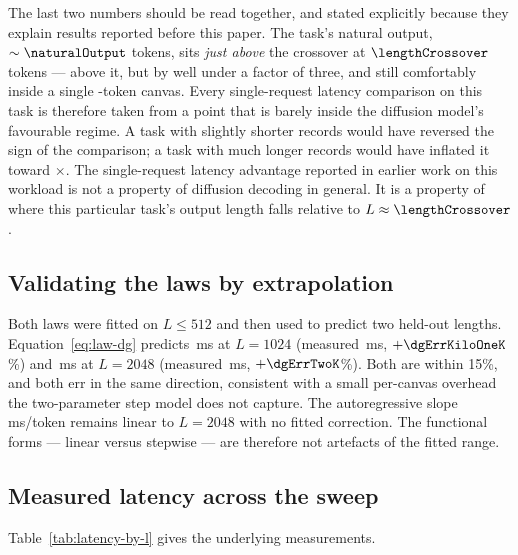 \noindent
The last two numbers should be read together, and stated explicitly because they
explain results reported before this paper. The task's natural output,
$\sim\naturalOutput$ tokens, sits \emph{just above} the crossover at
$\lengthCrossover$ tokens --- above it, but by well under a factor of three, and
still comfortably inside a single \dgCanvas{}-token canvas. Every single-request
latency comparison on this task is therefore taken from a point that is barely
inside the diffusion model's favourable regime. A task with slightly shorter
records would have reversed the sign of the comparison; a task with much longer
records would have inflated it toward \asymptoticRatio$\times$. The
single-request latency advantage reported in earlier work on this workload is
not a property of diffusion decoding in general. It is a property of where this
particular task's output length falls relative to
$L \approx \lengthCrossover$.

\subsection{Validating the laws by extrapolation}
\label{sec:cost-laws:validation}

Both laws were fitted on $L \le 512$ and then used to predict two held-out
lengths. Equation~\eqref{eq:law-dg} predicts \dgPredKiloOneK{}\,ms at $L=1024$
(measured \dgMeasKiloOneK{}\,ms, $+\dgErrKiloOneK$\%) and \dgPredTwoK{}\,ms at
$L=2048$ (measured \dgMeasTwoK{}\,ms, $+\dgErrTwoK$\%). Both are within 15\%,
and both err in the same direction, consistent with a small per-canvas overhead
the two-parameter step model does not capture. The autoregressive slope
\arSlope{}\,ms/token remains linear to $L=2048$ with no fitted correction. The
functional forms --- linear versus stepwise --- are therefore not artefacts of
the fitted range.

\subsection{Measured latency across the sweep}
\label{sec:cost-laws:table}

Table~\ref{tab:latency-by-l} gives the underlying measurements.

